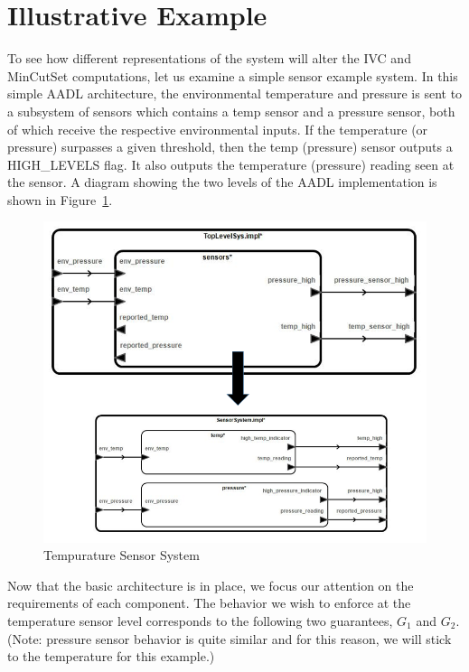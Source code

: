 \section{Illustrative Example}
To see how different representations of the system will alter the IVC and MinCutSet computations, let us examine a simple sensor example system. In this simple AADL architecture, the environmental temperature and pressure is sent to a subsystem of sensors which contains a temp sensor and a pressure sensor, both of which receive the respective environmental inputs. If the temperature (or pressure) surpasses a given threshold, then the temp (pressure) sensor outputs a HIGH\_LEVELS flag. It also outputs the temperature (pressure) reading seen at the sensor. A diagram showing the two levels of the AADL implementation is shown in Figure~\ref{fig:sensorGran1}.  

\begin{figure}[h]
\begin{center}
\includegraphics[width=14cm]{images/sensorGran.png}
\caption{Tempurature Sensor System} 
\label{fig:sensorGran1}
\end{center}
\end{figure}

Now that the basic architecture is in place, we focus our attention on the requirements of each component. The behavior we wish to enforce at the temperature sensor level corresponds to the following two guarantees, $G_1$ and $G_2$. (Note: pressure sensor behavior is quite similar and for this reason, we will stick to the temperature for this example.) 

